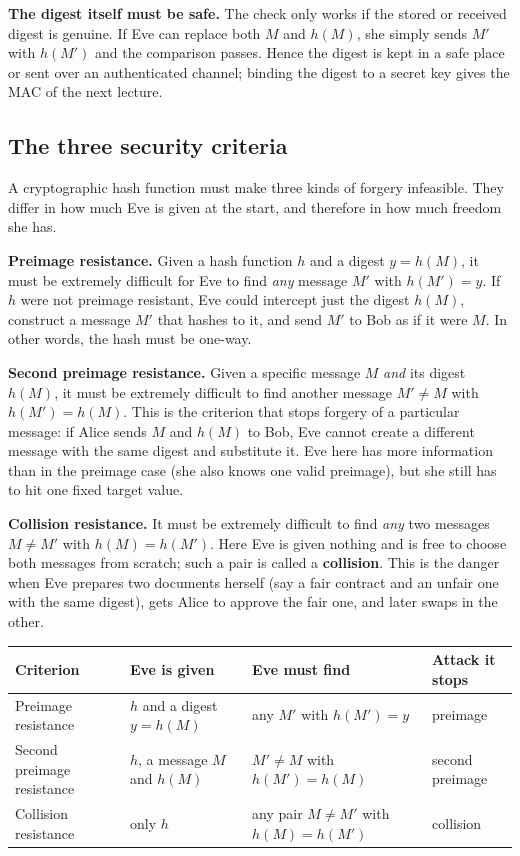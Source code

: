 \textbf{The digest itself must be safe.} The check only works if the stored or received digest is genuine. If Eve can replace both $M$ and $h(M)$, she simply sends $M'$ with $h(M')$ and the comparison passes. Hence the digest is kept in a safe place or sent over an authenticated channel; binding the digest to a secret key gives the MAC of the next lecture.

\subsection{The three security criteria \new}

A cryptographic hash function must make three kinds of forgery infeasible. They differ in how much Eve is given at the start, and therefore in how much freedom she has.

\textbf{Preimage resistance.} Given a hash function $h$ and a digest $y = h(M)$, it must be extremely difficult for Eve to find \emph{any} message $M'$ with $h(M') = y$. If $h$ were not preimage resistant, Eve could intercept just the digest $h(M)$, construct a message $M'$ that hashes to it, and send $M'$ to Bob as if it were $M$. In other words, the hash must be one-way.

\textbf{Second preimage resistance.} Given a specific message $M$ \emph{and} its digest $h(M)$, it must be extremely difficult to find another message $M' \ne M$ with $h(M') = h(M)$. This is the criterion that stops forgery of a particular message: if Alice sends $M$ and $h(M)$ to Bob, Eve cannot create a different message with the same digest and substitute it. Eve here has more information than in the preimage case (she also knows one valid preimage), but she still has to hit one fixed target value.

\textbf{Collision resistance.} It must be extremely difficult to find \emph{any} two messages $M \ne M'$ with $h(M) = h(M')$. Here Eve is given nothing and is free to choose both messages from scratch; such a pair is called a \textbf{collision}. This is the danger when Eve prepares two documents herself (say a fair contract and an unfair one with the same digest), gets Alice to approve the fair one, and later swaps in the other.

\begin{center}\small
\begin{tabularx}{\textwidth}{@{}l X X l@{}}
\toprule
Criterion & Eve is given & Eve must find & Attack it stops\\
\midrule
Preimage resistance & $h$ and a digest $y = h(M)$ & any $M'$ with $h(M') = y$ & preimage\\
Second preimage resistance & $h$, a message $M$ and $h(M)$ & $M' \ne M$ with $h(M') = h(M)$ & second preimage\\
Collision resistance & only $h$ & any pair $M \ne M'$ with $h(M) = h(M')$ & collision\\
\bottomrule
\end{tabularx}
\end{center}

